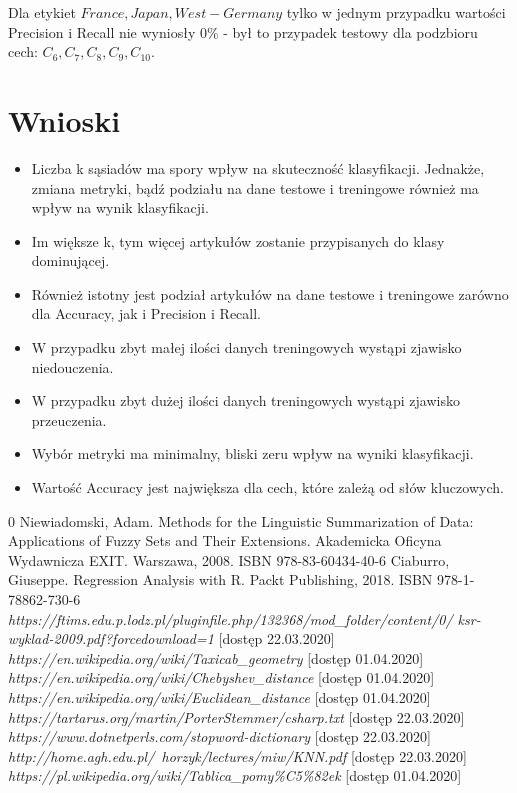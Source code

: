 \documentclass{classrep}
\begin{document}
Dla etykiet $France, Japan, West-Germany$ tylko w jednym przypadku wartości Precision i Recall nie wyniosły 0\% - był to przypadek testowy dla podzbioru cech: $C_6, C_7, C_8, C_9, C_{10}$.

\newpage
\section{Wnioski}
\begin{itemize}
	\item Liczba k sąsiadów ma spory wpływ na skuteczność klasyfikacji. Jednakże, zmiana metryki, bądź podziału na dane testowe i treningowe również ma wpływ na wynik klasyfikacji.
	\item Im większe k, tym więcej artykułów zostanie przypisanych do klasy dominującej.
	\item Również istotny jest podział artykułów na dane testowe i treningowe zarówno dla Accuracy, jak i Precision i Recall. 
	\item W przypadku zbyt małej ilości danych treningowych wystąpi zjawisko niedouczenia.
	\item W przypadku zbyt dużej ilości danych treningowych wystąpi zjawisko przeuczenia.
	\item Wybór metryki ma minimalny, bliski zeru wpływ na wyniki klasyfikacji.
	\item Wartość Accuracy jest największa dla cech, które zależą od słów kluczowych.

\end{itemize}


\begin{thebibliography} {0}
 Niewiadomski, Adam. Methods for the Linguistic Summarization of Data: Applications of Fuzzy Sets and Their Extensions. Akademicka Oficyna Wydawnicza EXIT. Warszawa, 2008. ISBN 978-83-60434-40-6
 Ciaburro, Giuseppe. Regression Analysis with R. Packt Publishing, 2018. ISBN 978-1-78862-730-6
 \textsl{https://ftims.edu.p.lodz.pl/pluginfile.php/132368/mod\_folder/content/0/
ksr-wyklad-2009.pdf?forcedownload=1} [dostęp 22.03.2020]
 \textsl{https://en.wikipedia.org/wiki/Taxicab\_geometry} [dostęp 01.04.2020]
 \textsl{https://en.wikipedia.org/wiki/Chebyshev\_distance} [dostęp 01.04.2020]
 \textsl{https://en.wikipedia.org/wiki/Euclidean\_distance} [dostęp 01.04.2020]
 \textsl{https://tartarus.org/martin/PorterStemmer/csharp.txt} [dostęp 22.03.2020]
 \textsl{https://www.dotnetperls.com/stopword-dictionary} [dostęp 22.03.2020]
 \textsl{http://home.agh.edu.pl/~horzyk/lectures/miw/KNN.pdf} [dostęp 22.03.2020]
 \textsl{https://pl.wikipedia.org/wiki/Tablica\_pomy\%C5\%82ek} [dostęp 01.04.2020]

\end{thebibliography}
\end{document}
